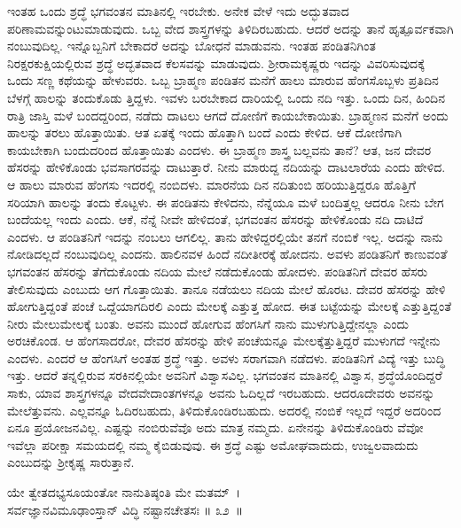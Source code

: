 ಇಂತಹ ಒಂದು ಶ್ರದ್ಧೆ ಭಗವಂತನ ಮಾತಿನಲ್ಲಿ ಇರಬೇಕು. ಅನೇಕ ವೇಳೆ ಇದು ಅದ್ಭುತವಾದ ಪರಿಣಾಮವನ್ನುಂಟುಮಾಡುವುದು. ಒಬ್ಬ ವೇದ ಶಾಸ್ತ್ರಗಳನ್ನು ತಿಳಿದಿರಬಹುದು. ಆದರೆ ಅದನ್ನು ತಾನೆ ಹೃತ್ಪೂರ್ವಕವಾಗಿ ನಂಬುವುದಿಲ್ಲ. ಇನ್ನೊಬ್ಬನಿಗೆ ಬೇಕಾದರೆ ಅದನ್ನು ಬೋಧನೆ ಮಾಡುವನು. ಇಂತಹ ಪಂಡಿತನಿಗಿಂತ ನಿರಕ್ಷರಕುಕ್ಷಿಯಲ್ಲಿರುವ ಶ್ರದ್ಧೆ ಅದ್ಭತವಾದ ಕೆಲಸವನ್ನು ಮಾಡುವುದು. ಶ‍್ರೀರಾಮಕೃಷ್ಣರು ಇದನ್ನು ವಿವರಿಸುವುದಕ್ಕೆ ಒಂದು ಸಣ್ಣ ಕಥೆಯನ್ನು ಹೇಳುವರು. ಒಬ್ಬ ಬ್ರಾಹ್ಮಣ ಪಂಡಿತನ ಮನೆಗೆ ಹಾಲು ಮಾರುವ ಹೆಂಗಸೊಬ್ಬಳು ಪ್ರತಿದಿನ ಬೆಳಗ್ಗೆ ಹಾಲನ್ನು ತಂದುಕೊಡು ತ್ತಿದ್ದಳು. ಇವಳು ಬರಬೇಕಾದ ದಾರಿಯಲ್ಲಿ ಒಂದು ನದಿ ಇತ್ತು. ಒಂದು ದಿನ, ಹಿಂದಿನ ರಾತ್ರಿ ಜಾಸ್ತಿ ಮಳೆ ಬಂದದ್ದರಿಂದ, ನಡೆದು ದಾಟಲು ಆಗದೆ ದೋಣಿಗೆ ಕಾಯಬೇಕಾಯಿತು. ಬ್ರಾಹ್ಮಣನ ಮನೆಗೆ ಅಂದು ಹಾಲನ್ನು ತರಲು ಹೊತ್ತಾಯಿತು. ಆತ ಏತಕ್ಕೆ ಇಂದು ಹೊತ್ತಾಗಿ ಬಂದೆ ಎಂದು ಕೇಳಿದ. ಆಕೆ ದೋಣಿಗಾಗಿ ಕಾಯಬೇಕಾಗಿ ಬಂದುದರಿಂದ ಹೊತ್ತಾಯಿತು ಎಂದಳು. ಈ ಬ್ರಾಹ್ಮಣ ಶಾಸ್ತ್ರ ಬಲ್ಲವನು ತಾನೆ? ಆತ, ಜನ ದೇವರ ಹೆಸರನ್ನು ಹೇಳಿಕೊಂಡು ಭವಸಾಗರವನ್ನು ದಾಟುತ್ತಾರೆ. ನೀನು ಮಾರುದ್ದ ನದಿಯನ್ನು ದಾಟಲಾರೆಯ ಎಂದು ಹೇಳಿದ. ಆ ಹಾಲು ಮಾರುವ ಹೆಂಗಸು ಇದರಲ್ಲಿ ನಂಬಿದಳು. ಮಾರನೆಯ ದಿನ ನದಿತುಂಬಿ ಹರಿಯುತ್ತಿದ್ದರೂ ಹೊತ್ತಿಗೆ ಸರಿಯಾಗಿ ಹಾಲನ್ನು ತಂದು ಕೊಟ್ಟಳು. ಈ ಪಂಡಿತನು ಕೇಳಿದನು, ನೆನ್ನೆಯೂ ಮಳೆ ಬಂದಿತ್ತಲ್ಲ ಆದರೂ ನೀನು ಬೇಗ ಬಂದೆಯಲ್ಲ ಇಂದು ಎಂದು. ಆಕೆ, ನೆನ್ನೆ ನೀವೇ ಹೇಳಿದಂತೆ, ಭಗವಂತನ ಹೆಸರನ್ನು ಹೇಳಿಕೊಂಡು ನದಿ ದಾಟಿದೆ ಎಂದಳು. ಆ ಪಂಡಿತನಿಗೆ ಇದನ್ನು ನಂಬಲು ಆಗಲಿಲ್ಲ. ತಾನು ಹೇಳಿದ್ದರಲ್ಲಿಯೇ ತನಗೆ ನಂಬಿಕೆ ಇಲ್ಲ. ಅದನ್ನು ನಾನು ನೋಡಿದಲ್ಲದೆ ನಂಬುವುದಿಲ್ಲ ಎಂದನು. ಹಾಲಿನವಳ ಹಿಂದೆ ನದೀತೀರಕ್ಕೆ ಹೋದನು. ಅವಳು ಪಂಡಿತನಿಗೆ ಕಾಣುವಂತೆ ಭಗವಂತನ ಹೆಸರನ್ನು ತೆಗೆದುಕೊಂಡು ನದಿಯ ಮೇಲೆ ನಡೆದುಕೊಂಡು ಹೋದಳು. ಪಂಡಿತನಿಗೆ ದೇವರ ಹೆಸರು ತೇಲಿಸುವುದು ಎಂಬುದು ಆಗ ಗೊತ್ತಾಯಿತು. ತಾನೂ ನಡೆಯಲು ನದಿಯ ಮೇಲೆ ಹೊರಟ. ದೇವರ ಹೆಸರನ್ನು ಹೇಳಿ ಹೋಗುತ್ತಿದ್ದಂತೆ ಪಂಚೆ ಒದ್ದೆಯಾಗದಿರಲಿ ಎಂದು ಮೇಲಕ್ಕೆ ಎತ್ತುತ್ತ ಹೋದ. ಈತ ಬಟ್ಟೆಯನ್ನು ಮೇಲಕ್ಕೆ ಎತ್ತುತ್ತಿದ್ದಂತೆ ನೀರು ಮೇಲುಮೇಲಕ್ಕೆ ಬಂತು. ಅವನು ಮುಂದೆ ಹೋಗುವ ಹೆಂಗಸಿಗೆ ನಾನು ಮುಳುಗುತ್ತಿದ್ದೇನಲ್ಲಾ ಎಂದು ಅರಚಿಕೊಂಡ. ಆ ಹೆಂಗಸಾದರೋ, ದೇವರ ಹೆಸರನ್ನು ಹೇಳಿ ಪಂಚೆಯನ್ನೂ ಮೇಲಕ್ಕೆತ್ತುತ್ತಿದ್ದರೆ ಮುಳುಗದೆ ಇನ್ನೇನು ಎಂದಳು. ಎಂದರೆ ಆ ಹೆಂಗಸಿಗೆ ಅಂತಹ ಶ್ರದ್ಧೆ ಇತ್ತು. ಅವಳು ಸರಾಗವಾಗಿ ನಡೆದಳು. ಪಂಡಿತನಿಗೆ ವಿದ್ಯೆ ಇತ್ತು ಬುದ್ಧಿ ಇತ್ತು. ಆದರೆ ತನ್ನಲ್ಲಿರುವ ಸರಕಿನಲ್ಲಿಯೇ ಅವನಿಗೆ ವಿಶ್ವಾಸವಿಲ್ಲ. ಭಗವಂತನ ಮಾತಿನಲ್ಲಿ ವಿಶ್ವಾಸ, ಶ್ರದ್ಧೆ\-ಯೊಂದಿದ್ದರೆ ಸಾಕು, ಯಾವ ಶಾಸ್ತ್ರಗಳನ್ನೂ ವೇದವೇದಾಂತಗಳನ್ನೂ ಅವನು ಓದಿಲ್ಲದೆ ಇರಬಹುದು. ಆದರೂ\break ದೇವರು ಅವನನ್ನು ಮೇಲೆತ್ತುವನು. ಎಲ್ಲವನ್ನೂ ಓದಿರಬಹುದು, ತಿಳಿದುಕೊಂಡಿರಬಹುದು. ಅದರಲ್ಲಿ ನಂಬಿಕೆ ಇಲ್ಲದೆ ಇದ್ದರೆ ಅದರಿಂದ ಏನೂ ಪ್ರಯೋಜನವಿಲ್ಲ. ಎಷ್ಟನ್ನು ನಂಬಿರುವೆವೊ ಅದು ಮಾತ್ರ ನಮ್ಮದು. ಏನೇನನ್ನು ತಿಳಿದುಕೊಂಡಿರು ವೆವೋ ಇವೆಲ್ಲಾ ಪರೀಕ್ಷಾ ಸಮಯದಲ್ಲಿ ನಮ್ಮ ಕೈಬಿಡುವುವು. ಈ ಶ್ರದ್ಧೆ ಎಷ್ಟು ಅಮೋಘವಾದುದು, ಉಜ್ವಲವಾದುದು ಎಂಬುದನ್ನು ಶ‍್ರೀಕೃಷ್ಣ ಸಾರುತ್ತಾನೆ.

\begin{shloka}
ಯೇ ತ್ವೇತದಭ್ಯಸೂಯಂತೋ ನಾನುತಿಷ್ಠಂತಿ ಮೇ ಮತಮ್~।\\ಸರ್ವಜ್ಞಾನವಿಮೂಢಾಂಸ್ತಾನ್ ವಿದ್ಧಿ ನಷ್ಟಾನಚೇತಸಃ \hfill॥ ೩೨~॥
\end{shloka}

